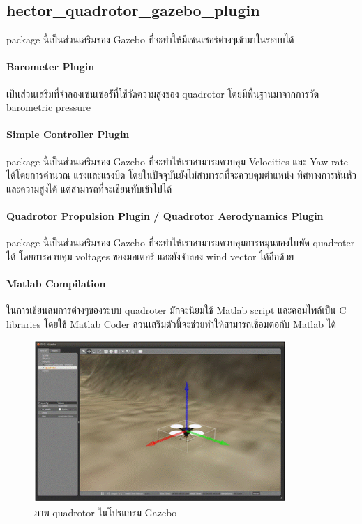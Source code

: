 \vspace{20pt}
\subsection{hector\_quadrotor\_gazebo\_plugin}
package นี้เป็นส่วนเสริมของ Gazebo ที่จะทำให้มีเซนเซอร์ต่างๆเข้ามาในระบบได้
\paragraph*{Barometer Plugin}
เป็นส่วนเสริมที่จำลองเซนเซอร์ัที่ใช้วัดความสูงของ quadrotor โดยมีพื้นฐานมาจากการวัด barometric pressure
\paragraph*{Simple Controller Plugin}
package นี้เป็นส่วนเสริมของ Gazebo ที่จะทำให้เราสามารถควบคุม Velocities และ Yaw rate ได้โดยการคำนวณ แรงและแรงบิด
โดยในปัจจุบันยังไม่สามารถที่จะควบคุมตำแหน่ง ทิศทางการหันหัว และความสูงได้ แต่สามารถที่จะเขียนทับเข้าไปได้
\paragraph*{Quadrotor Propulsion Plugin / Quadrotor Aerodynamics Plugin}
package นี้เป็นส่วนเสริมของ Gazebo ที่จะทำให้เราสามารถควบคุมการหมุนของใบพัด quadroter ได้ โดยการควบคุม voltages ของมอเตอร์
และยังจำลอง wind vector ได้อีกด้วย
\paragraph*{Matlab Compilation}
ในการเขียนสมการต่างๆของระบบ quadroter มักจะนิยมใช้ Matlab script และคอมไพล์เป็น C libraries โดยใช้ Matlab Coder
ส่วนเสริมตัวนี้จะช่วยทำให้สามารถเชื่อมต่อกับ Matlab ได้

\begin{figure}[!ht]
	\centering
	\includegraphics[width=0.85\textwidth]{images/hector_quadrotor_gazebo.png}
	\caption{ภาพ quadrotor ในโปรแกรม Gazebo}
	\label{fig:hector_quadrotor_gazebo}
\end{figure}
